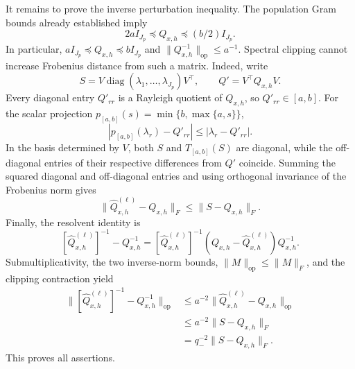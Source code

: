It remains to prove the inverse perturbation inequality. The population Gram bounds already established imply
\[
 2aI_{J_p}\preceq Q_{x,h}\preceq (b/2)I_{J_p}.
\]
In particular, \(aI_{J_p}\preceq Q_{x,h}\preceq bI_{J_p}\) and \(\lVert Q_{x,h}^{-1}\rVert_{\mathrm{op}}\le a^{-1}\). Spectral clipping cannot increase Frobenius distance from such a matrix. Indeed, write
\[
 S=V\operatorname{diag}(\lambda_1,\ldots,\lambda_{J_p})V^\top,
 \qquad Q'=V^\top Q_{x,h}V.
\]
Every diagonal entry \(Q'_{rr}\) is a Rayleigh quotient of \(Q_{x,h}\), so \(Q'_{rr}\in[a,b]\). For the scalar projection \(p_{[a,b]}(s)=\min\{b,\max\{a,s\}\}\),
\[
 |p_{[a,b]}(\lambda_r)-Q'_{rr}|
 \le |\lambda_r-Q'_{rr}|.
\]
In the basis determined by \(V\), both \(S\) and \(T_{[a,b]}(S)\) are diagonal, while the off-diagonal entries of their respective differences from \(Q'\) coincide. Summing the squared diagonal and off-diagonal entries and using orthogonal invariance of the Frobenius norm gives
\[
 \lVert\widehat Q^{(\ell)}_{x,h}-Q_{x,h}\rVert_F
 \le \lVert S-Q_{x,h}\rVert_F.
\]
Finally, the resolvent identity is
\[
 [\widehat Q^{(\ell)}_{x,h}]^{-1}-Q_{x,h}^{-1}
 = [\widehat Q^{(\ell)}_{x,h}]^{-1}
 (Q_{x,h}-\widehat Q^{(\ell)}_{x,h})Q_{x,h}^{-1}.
\]
Submultiplicativity, the two inverse-norm bounds, \(\lVert M\rVert_{\mathrm{op}}\le\lVert M\rVert_F\), and the clipping contraction yield
\[
\begin{aligned}
 \bigl\lVert[\widehat Q^{(\ell)}_{x,h}]^{-1}-Q_{x,h}^{-1}\bigr\rVert_{\mathrm{op}}
 &\le a^{-2}\lVert\widehat Q^{(\ell)}_{x,h}-Q_{x,h}\rVert_{\mathrm{op}}\\
 &\le a^{-2}\lVert S-Q_{x,h}\rVert_F\\
 &=q_-^{-2}\lVert S-Q_{x,h}\rVert_F.
\end{aligned}
\]
This proves all assertions.